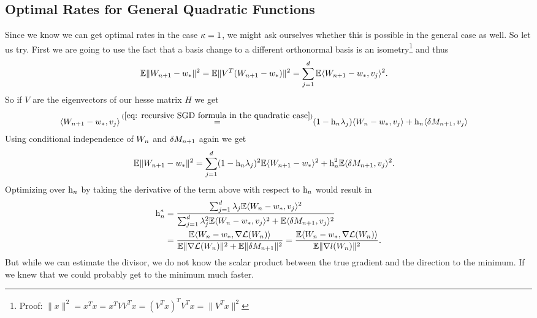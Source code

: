 \subsection{Optimal Rates for General Quadratic Functions}

Since we know we can get optimal rates in the case \(\kappa=1\), we might
ask ourselves whether this is possible in the general case as well. So let us
try. First we are going to use the fact that a basis change to a different
orthonormal basis is an isometry\footnote{
	Proof: \(\|x\|^2 = x^Tx = x^TVV^Tx = (V^T x)^T V^Tx = \|V^T x\|^2\)
}
and thus
\begin{align*}
	\mathbb{E}\|W_{n+1} - w_*\|^2
	&= \mathbb{E}\|V^T(W_{n+1} - w_*)\|^2
	= \sum_{j=1}^d \mathbb{E}\langle W_{n+1}-w_*, v_j\rangle^2.
\end{align*}
So if \(V\) are the eigenvectors of our hesse matrix \(H\) we get
\begin{align*}
	\langle \Weights_{n+1}-\minimum, v_j \rangle
	&\xeq{(\ref{eq: recursive SGD formula in the quadratic case})} (1-\lr_n\lambda_j)\langle\Weights_n-\minimum, v_j\rangle
	+ \lr_n\langle\martIncr_{n+1},v_j\rangle
\end{align*}
Using conditional independence of \(W_n\) and \(\delta M_{n+1}\) again we get
\begin{align}
	\label{eq: expected square error in quadratic case}
	\mathbb{E}\|W_{n+1} - w_*\|^2
	&= \sum_{j=1}^d (1-\text{h}_n \lambda_j)^2 \mathbb{E}\langle W_{n+1}-w_*\rangle^2
	+ \text{h}_n^2 \mathbb{E}\langle \delta M_{n+1}, v_j\rangle^2.
\end{align}
Optimizing over \(\text{h}_n\) by taking the derivative of the term above with
respect to \(\text{h}_n\) would result in
\begin{align*}
	\text{h}_n^* &= \frac{
		\sum_{j=1}^d \lambda_j \mathbb{E}\langle W_n-w_*, v_j\rangle^2
	}{
		\sum_{j=1}^d\lambda_j^2\mathbb{E}\langle W_n-w_*, v_j\rangle^2
		+ \mathbb{E}\langle\delta M_{n+1}, v_j\rangle^2
	}\\
	&= \frac{
		\mathbb{E}\langle W_n - w_*, \nabla\mathcal{L}(W_n)\rangle
	}{
		\mathbb{E}\|\nabla\mathcal{L}(W_n)\|^2 + \mathbb{E}\|\delta M_{n+1}\|^2
	}
	= \frac{
		\mathbb{E}\langle W_n - w_*, \nabla\mathcal{L}(W_n)\rangle
	}{
		\mathbb{E}\|\nabla l(W_n)\|^2
	}.
\end{align*}
But while we can estimate the divisor, we do not know the scalar product between
the true gradient and the direction to the minimum. If we knew that we could
probably get to the minimum much faster.

